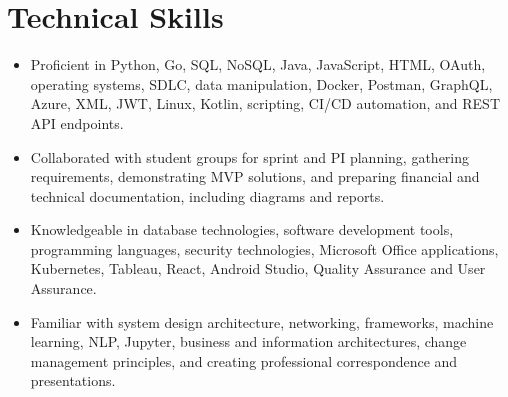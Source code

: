 \documentclass[letterpaper,10pt]{article}
\newcommand{\resumeItem}[1]{
  \item\small{
    {#1 \vspace{-2pt}}
  }
}
\newcommand{\resumeItemListStart}{\begin{itemize}}
\newcommand{\resumeItemListEnd}{\end{itemize}\vspace{-4pt}}
\begin{document}
\section{Technical Skills}
 \begin{itemize}[leftmargin=0.0in, label={}]
\resumeItemListStart
    \resumeItem{Proficient in Python, Go, SQL, NoSQL, Java, JavaScript, HTML, OAuth, operating systems, SDLC, data manipulation, Docker, Postman, GraphQL, Azure, XML, JWT, Linux, Kotlin, scripting, CI/CD automation, and REST API endpoints.}
    
    \resumeItem{Collaborated with student groups for sprint and PI planning, gathering requirements, demonstrating MVP solutions, and preparing financial and technical documentation, including diagrams and reports.}
    
    \resumeItem{Knowledgeable in database technologies, software development tools, programming languages, security technologies, Microsoft Office applications, Kubernetes, Tableau, React, Android Studio, Quality Assurance and User Assurance.}
    
    \resumeItem{Familiar with system design architecture, networking, frameworks, machine learning, NLP, Jupyter, business and information architectures, change management principles, and creating professional correspondence and presentations.}
\resumeItemListEnd
 \end{itemize}
\end{document}
